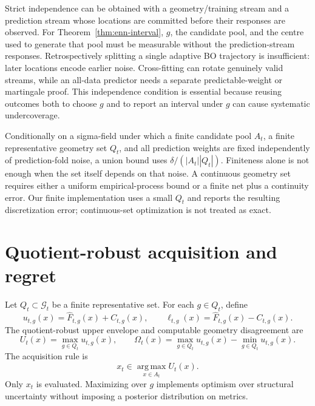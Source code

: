 \documentclass[11pt]{article}
\theoremstyle{definition}
\theoremstyle{remark}
\newcommand{\Gg}{\mathcal G}
\newcommand{\1}{\mathbf 1}
\newcommand{\argmax}{\operatorname*{arg\,max}}
\begin{document}
Strict independence can be obtained with a geometry/training stream and a prediction stream whose
locations are committed before their responses are observed.  For Theorem~\ref{thm:enn-interval}, $g$, the candidate
pool, and the centre used to generate that pool must be measurable without the prediction-stream
responses.  Retrospectively splitting a single adaptive BO trajectory is insufficient: later
locations encode earlier noise.  Cross-fitting can rotate genuinely valid streams, while an all-data
predictor needs a separate predictable-weight or martingale proof.  This independence condition is
essential because reusing outcomes both to choose $g$ and to report an interval under $g$ can cause
systematic undercoverage.

Conditionally on a sigma-field under which a finite candidate pool $A_t$, a finite representative
geometry set $Q_t$, and all prediction weights are fixed independently of prediction-fold noise, a
union bound uses $\delta/(|A_t||Q_t|)$.  Finiteness alone is not enough when the set itself depends
on that noise.  A continuous geometry set requires either a uniform empirical-process bound or a
finite net plus a continuity error.  Our finite implementation uses a small $Q_t$ and reports the
resulting discretization error; continuous-set optimization is not treated as exact.

\section{Quotient-robust acquisition and regret}

Let $Q_t\subset\Gg_t$ be a finite representative set.  For each $g\in Q_t$, define
\begin{equation}\label{eq:intervals}
  u_{t,g}(x)=\widehat F_{t,g}(x)+C_{t,g}(x),
  \qquad
  \ell_{t,g}(x)=\widehat F_{t,g}(x)-C_{t,g}(x).
\end{equation}
The quotient-robust upper envelope and computable geometry disagreement are
\begin{equation}\label{eq:robust-envelope}
  U_t(x)=\max_{g\in Q_t}u_{t,g}(x),
  \qquad
  \Omega_t(x)=
  \max_{g\in Q_t}u_{t,g}(x)-\min_{g\in Q_t}u_{t,g}(x).
\end{equation}
The acquisition rule is
\begin{equation}\label{eq:qr-ucb}
  x_t\in\argmax_{x\in A_t}U_t(x).
\end{equation}
Only $x_t$ is evaluated.  Maximizing over $g$ implements optimism over structural uncertainty
without imposing a posterior distribution on metrics.
\end{document}
